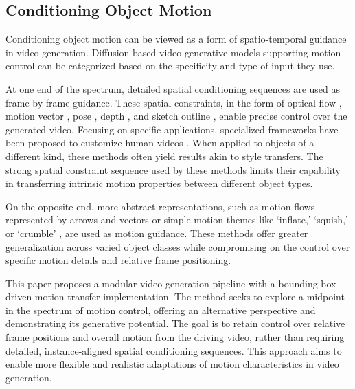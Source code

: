 \subsection{Conditioning Object Motion}

Conditioning object motion can be viewed as a form of spatio-temporal guidance in video generation. Diffusion-based video generative models supporting motion control can be categorized based on the specificity and type of input they use.

At one end of the spectrum, detailed spatial conditioning sequences are used as frame-by-frame guidance. These spatial constraints, in the form of optical flow \cite{ni2023conditional}, motion vector \cite{2023videocomposer}, pose \cite{feng2023dreamoving}, depth \cite{2023videocomposer, feng2023dreamoving}, and sketch outline \cite{2023videocomposer}, enable precise control over the generated video. Focusing on specific applications, specialized frameworks have been proposed to customize human videos \cite{feng2023dreamoving}. When applied to objects of a different kind, these methods often yield results akin to style transfers. The strong spatial constraint sequence used by these methods limits their capability in transferring intrinsic motion properties between different object types.

On the opposite end, more abstract representations, such as motion flows represented by arrows \cite{yin2023dragnuwa, 2023videocomposer} and vectors \cite{2023videocomposer} or simple motion themes like ‘inflate,’ ‘squish,’ or ‘crumble’ \cite{Pikaffect}, are used as motion guidance. These methods offer greater generalization across varied object classes while compromising on the control over specific motion details and relative frame positioning.

This paper proposes a modular video generation pipeline with a bounding-box driven motion transfer implementation. The method seeks to explore a midpoint in the spectrum of motion control, offering an alternative perspective and demonstrating its generative potential. The goal is to retain control over relative frame positions and overall motion from the driving video, rather than requiring detailed, instance-aligned spatial conditioning sequences. This approach aims to enable more flexible and realistic adaptations of motion characteristics in video generation.
